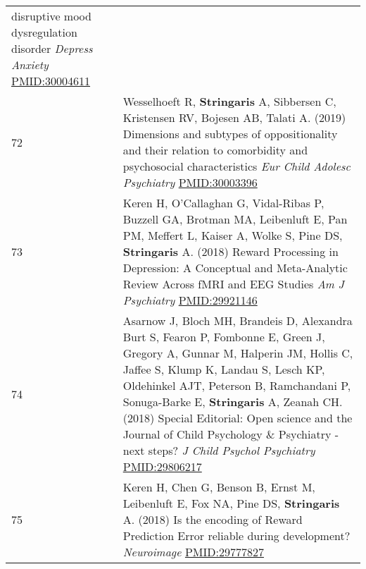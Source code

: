 \documentclass[
]{article}
\begin{document}
\begin{longtable}[]{@{}ll@{}}
\begin{minipage}[t]{0.94\columnwidth}
disruptive mood dysregulation disorder \emph{Depress Anxiety}
\url{PMID:30004611}\strut
\end{minipage}\tabularnewline
\begin{minipage}[t]{0.01\columnwidth}\raggedright
72\strut
\end{minipage} & \begin{minipage}[t]{0.94\columnwidth}\raggedright
Wesselhoeft R, \textbf{Stringaris} A, Sibbersen C, Kristensen RV,
Bojesen AB, Talati A. (2019) Dimensions and subtypes of oppositionality
and their relation to comorbidity and psychosocial characteristics
\emph{Eur Child Adolesc Psychiatry} \url{PMID:30003396}\strut
\end{minipage}\tabularnewline
\begin{minipage}[t]{0.01\columnwidth}\raggedright
73\strut
\end{minipage} & \begin{minipage}[t]{0.94\columnwidth}\raggedright
Keren H, O'Callaghan G, Vidal-Ribas P, Buzzell GA, Brotman MA,
Leibenluft E, Pan PM, Meffert L, Kaiser A, Wolke S, Pine DS,
\textbf{Stringaris} A. (2018) Reward Processing in Depression: A
Conceptual and Meta-Analytic Review Across fMRI and EEG Studies \emph{Am
J Psychiatry} \url{PMID:29921146}\strut
\end{minipage}\tabularnewline
\begin{minipage}[t]{0.01\columnwidth}\raggedright
74\strut
\end{minipage} & \begin{minipage}[t]{0.94\columnwidth}\raggedright
Asarnow J, Bloch MH, Brandeis D, Alexandra Burt S, Fearon P, Fombonne E,
Green J, Gregory A, Gunnar M, Halperin JM, Hollis C, Jaffee S, Klump K,
Landau S, Lesch KP, Oldehinkel AJT, Peterson B, Ramchandani P,
Sonuga-Barke E, \textbf{Stringaris} A, Zeanah CH. (2018) Special
Editorial: Open science and the Journal of Child Psychology \&
Psychiatry - next steps? \emph{J Child Psychol Psychiatry}
\url{PMID:29806217}\strut
\end{minipage}\tabularnewline
\begin{minipage}[t]{0.01\columnwidth}\raggedright
75\strut
\end{minipage} & \begin{minipage}[t]{0.94\columnwidth}\raggedright
Keren H, Chen G, Benson B, Ernst M, Leibenluft E, Fox NA, Pine DS,
\textbf{Stringaris} A. (2018) Is the encoding of Reward Prediction Error
reliable during development? \emph{Neuroimage} \url{PMID:29777827}\strut
\end{minipage}\tabularnewline

\end{longtable}
\end{document}
